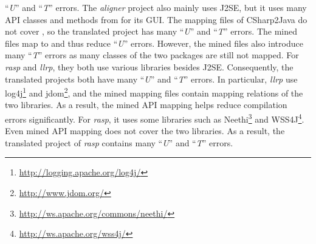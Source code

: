 ``\emph{U}'' and ``\emph{T}'' errors. The \emph{aligner} project
also mainly uses J2SE, but it uses many API classes and methods from
 for its GUI. The mapping files of CSharp2Java do
not cover , so the translated project has many
``\emph{U}'' and ``\emph{T}'' errors. The mined files map
 to  and thus reduce
``\emph{U}'' errors. However, the mined files also introduce many
``\emph{T}'' errors as many classes of the two packages are still
not mapped. For \emph{rasp} and \emph{llrp}, they both use various
libraries besides J2SE. Consequently, the translated projects both
have many ``\emph{U}'' and ``\emph{T}'' errors. In particular,
\emph{llrp} use
log4j\footnote{\url{http://logging.apache.org/log4j/}} and
jdom\footnote{\url{http://www.jdom.org/}}, and the mined mapping
files contain mapping relations of the two libraries. As a result,
the mined API mapping helps reduce compilation errors significantly.
For \emph{rasp}, it uses some libraries such as
Neethi\footnote{\url{http://ws.apache.org/commons/neethi/}} and
WSS4J\footnote{\url{http://ws.apache.org/wss4j/}}. Even mined API
mapping does not cover the two libraries. As a result, the
translated project of \emph{rasp} contains many ``\emph{U}'' and
``\emph{T}'' errors.

